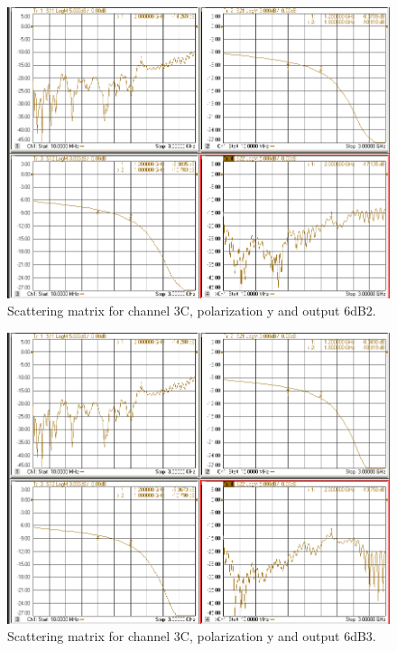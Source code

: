 \documentclass[12pt,a4paper,oneside]{article}
\begin{document}
\begin{figure}[H]
\centering
\includegraphics[width=0.9\linewidth]{VNA_results/3Cy_6dB2.png}
\caption{Scattering matrix for channel 3C, polarization y and output 6dB2.}
\label{fig:3Cy_6dB2}
\end{figure}


\begin{figure}[H]
\centering
\includegraphics[width=0.9\linewidth]{VNA_results/3Cy_6dB3.png}
\caption{Scattering matrix for channel 3C, polarization y and output 6dB3.}
\label{fig:3Cy_6dB3}
\end{figure}
\end{document}
